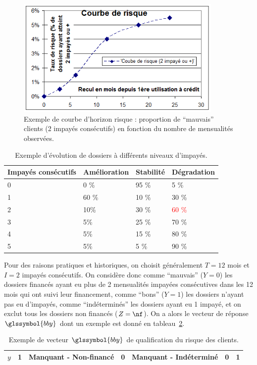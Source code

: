 \begin{figure}
\centering
\includegraphics[width=10cm]{figures/chapitre1/courbe_risque.png}
\caption{\label{fig:courbe_horizon} Exemple de courbe d'horizon risque : proportion de ``mauvais'' clients (2 impayés consécutifs) en fonction du nombre de mensualités observées.}
\end{figure}

\begin{table}
\centering
\caption{\label{tab:impayes} Exemple d'évolution de dossiers à différents niveaux d'impayés.} 
\begin{tabular}{l|l|l|l}
Impayés consécutifs & Amélioration & Stabilité & Dégradation \\
\hline
0 & 0 \% & 95 \% & 5 \%  \\
1 & 60 \% & 10 \% & 30 \%  \\
2 & 10\% & 30 \% & \textcolor{red}{60 \%} \\
3 & 5\% & 25 \% & {70 \%} \\
4 & 5\% & 15 \% & {80 \%} \\
5 & 5\% & 5 \% & {90 \%} \\
\end{tabular}
\end{table}

Pour des raisons pratiques et historiques, on choisit généralement $T=12$ mois et $I = 2$ impayés consécutifs. On considère donc comme ``mauvais'' ($Y=0$) les dossiers financés ayant eu plus de 2 mensualités impayées consécutives dans les 12 mois qui ont suivi leur financement, comme ``bons'' ($Y=1$) les dossiers n'ayant pas eu d'impayés, comme ``indéterminés'' les dossiers ayant eu 1 impayé, et on exclut tous les dossiers non financés ($Z=\nf$). On a alors le vecteur de réponse $\glssymbol{bby}$ dont un exemple est donné en tableau~\ref{tab:rep_ex}.

\begin{table}
\centering
\caption{\label{tab:rep_ex} Exemple de vecteur $\glssymbol{bby}$ de qualification du risque des clients.}
\begin{tabular}{|c|c|c|c|c|c|c|}
\hline
$y$ & 1 & Manquant - Non-financé & 0 & Manquant - Indéterminé & 0 & 1 \\
\hline
\end{tabular}
\end{table}


